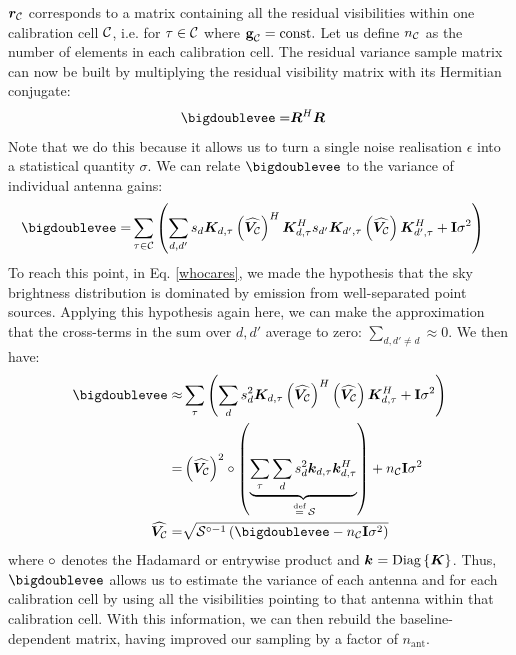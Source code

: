 \pg
$\bm{r}_{\mathcal{C}}$ corresponds to a matrix containing all the residual visibilities within one calibration cell $\mathcal{C}$, i.e. for $\tau \in \mathcal{C}$ where $\textbf{g}_{\mathcal{C}} = \mathrm{const.}$ Let us define $n_{\mathcal{C}}$ as the number of elements in each calibration cell. The residual variance sample matrix can now be built by multiplying the residual visibility matrix with its Hermitian conjugate:
\begin{align}
\matVV             =& \bm{R}^H \bm{R} \label{eq.matvv.definition} %
\end{align}
Note that we do this because it allows us to turn a single noise realisation $\epsilon$ into a statistical quantity $\sigma$.
We can relate $\matVV$ to the variance of individual antenna gains:
\begin{align}
\matVV
            =& \sum_{\tnuIndeix\in\cellindex} \left(\sum_{d,d'} s_d \Kmat{d,\tnuIndeix} \left( \VarmatC \right)^H \Kmat{d,\tnuIndeix}^H s_{d'} \Kmat{d',\tnuIndeix} \left( \VarmatC \right) \Kmat{d',\tnuIndeix}^H + \I\sigma^2 \right)
\end{align}
To reach this point, in Eq. \ref{whocares}, we made the hypothesis that the sky brightness distribution is dominated by emission from well-separated point sources. Applying this hypothesis again here, we can make the approximation that the cross-terms in the sum over $d,d'$ average to zero: $\sum_{d,d'\ne d}\approx 0$. We then have:
\begin{align}
\matVV\approx& \sum_\tnuIndeix \left(\sum_d s_d^2 \Kmat{d,\tnuIndeix} \left( \VarmatC \right)^H  \left( \VarmatC \right) \Kmat{d,\tnuIndeix}^H + \I\sigma^2\right)\\
            =& \left(\VarmatC\right)^2\hadam \left(\underbrace{\sum_{\tnuIndeix}\sum_d s_d^2 \kvect{d,\tnuIndeix}\kvect{d,\tnuIndeix}^H}_{\bydefn \mathcal{S}}\right) + n_\cellindex\I\sigma^2\\
\VarmatC    =& \sqrt{\mathcal{S}^{\hadam-1}\left(\matVV-n_\cellindex\I\sigma^2\right)}
\end{align}
where $\circ$ denotes the Hadamard or entrywise product and $\bm{k}_{}=\text{Diag}\left\{\bm{K}_{}\right\}$. %
Thus, $\matVV$ allows us to estimate the variance of each antenna and for each calibration cell by using all the visibilities pointing to that antenna within that calibration cell. With this information, we can then rebuild the baseline-dependent matrix, having improved our sampling by a factor of $n_{\mathrm{ant}}$.


